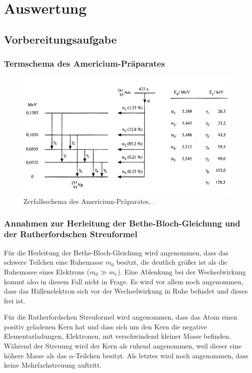 \section{Auswertung}
\label{sec:Auswertung}
\subsection{Vorbereitungsaufgabe}
\subsubsection{Termschema des Americium-Präparates}
\begin{figure}[h!]
	\centering
	\includegraphics[width=0.9\linewidth]{6362cb7a8529daf05d8e0be425b50d10bacfe0c3}
	\caption{Zerfallsschema des Americium-Präparates, \cite{AmericiumZerfall}.}
	\label{fig:6362cb7a8529daf05d8e0be425b50d10bacfe0c3}
\end{figure}
\subsubsection{Annahmen zur Herleitung der Bethe-Bloch-Gleichung und der Rutherfordschen Streuformel}
Für die Herleitung der Bethe-Bloch-Gleichung wird angenommen, dass das schwere Teilchen eine Ruhemasse $m_0$ besitzt, die deutlich größer ist als die Ruhemasse eines Elektrons ($m_0 \gg m_e$). Eine Ablenkung bei der Wechselwirkung kommt also in diesem Fall nicht in Frage. Es wird vor allem noch angenommen, dass das Hüllenelektron sich vor der Wechselwirkung in Ruhe befindet und dieses frei ist.

Für die Rutherfordschen Streuformel wird angenommen, dass das Atom einen positiv geladenen Kern hat und dass sich um den Kern die negative Elementarladungen, Elektronen, mit verschwindend kleiner Masse befinden. Während der Streuung wird der Kern als ruhend angenommen, weil dieser eine höhere Masse als das $\alpha$-Teilchen besitzt. Als letztes wird noch angenommen, dass keine Mehrfachstreuung auftritt.

